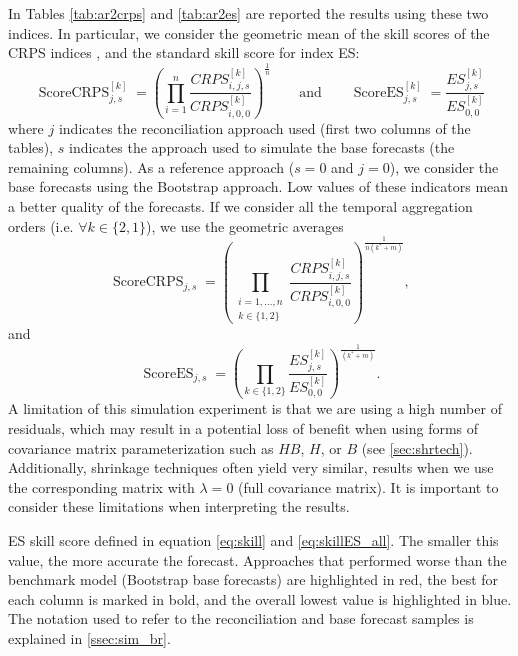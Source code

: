 \documentclass[a4paper,11pt]{article}
\theoremstyle{definition}
\begin{document}
In Tables \ref{tab:ar2crps} and \ref{tab:ar2es} are reported the results using these two indices. In
particular, we consider the geometric mean of the skill scores of the
CRPS indices \citep{fleming1986}, and the standard skill score
for index ES:
\begin{equation}\label{eq:skill}
	\operatorname{ScoreCRPS}_{j,s}^{[k]} = \left(\prod_{i = 1}^n \frac{CRPS^{[k]}_{i, j, s}}{CRPS^{[k]}_{i, 0, 0}}\right)^{\frac{1}{n}} \qquad \mathrm{and} \qquad \operatorname{ScoreES}_{j,s}^{[k]} = \frac{ES^{[k]}_{j, s}}{ES^{[k]}_{0, 0}}
\end{equation}
where $j$ indicates the reconciliation approach used (first two columns of the tables), $s$ indicates the approach used to simulate the base forecasts (the remaining columns). As a reference approach ($s=0$ and $j=0$), we consider the base forecasts using the Bootstrap approach. Low values of these indicators mean a better quality of the forecasts. If we consider all the temporal aggregation orders (i.e. $\forall k \in \{2,1\}$), we use the geometric averages
\begin{equation}\label{eq:skillCRPS_all}
	\operatorname{ScoreCRPS}_{j,s} = \left(\prod_{\substack{i = 1, \dots, n \\ k \in \{1,2\}}}\frac{CRPS^{[k]}_{i, j, s}}{CRPS^{[k]}_{i, 0, 0}}\right)^{\frac{1}{n(k^\ast+m)}},
\end{equation}
and
\begin{equation}\label{eq:skillES_all}
	\operatorname{ScoreES}_{j,s}= \left(\prod_{k \in \{1,2\}}\frac{ES^{[k]}_{j, s}}{ES^{[k]}_{0, 0}}\right)^{\frac{1}{(k^\ast+m)}}.
\end{equation}
A limitation of this simulation experiment is that we are using a high number of residuals, which may result in a potential loss of benefit when using forms of covariance matrix parameterization such as $HB$, $H$, or $B$ (see \autoref{sec:shrtech}). Additionally, shrinkage techniques often yield very similar, results when we use the corresponding matrix with $\lambda = 0$ (full covariance matrix). It is important to consider these limitations when interpreting the results.

\begin{table}[!t]
	\centering
	\begingroup
	\fontsize{9}{11}\selectfont
	
	\endgroup
	\caption{ES skill score defined in equation \eqref{eq:skill} and \eqref{eq:skillES_all}. The smaller this value, the more accurate the forecast. Approaches that performed worse than the benchmark model (Bootstrap base forecasts) are highlighted in red, the best for each column is marked in bold, and the overall lowest value is highlighted in blue. The notation used to refer to the reconciliation and base forecast samples is explained in \autoref{ssec:sim_br}.}
	\label{tab:ar2es}
\end{table}
\end{document}
